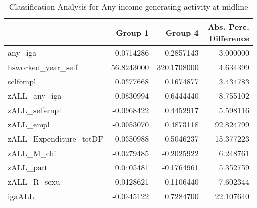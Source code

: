 \begin{table}

\caption{\label{tab:clanRany_iga}Classification Analysis for Any income-generating activity at midline}
\centering
\begin{tabular}[t]{lrrr}
\toprule
  & Group 1 & Group 4 & Abs. Perc. Difference\\
\midrule
any\_iga & 0.0714286 & 0.2857143 & 3.000000\\
hsworked\_year\_self & 56.8243000 & 320.1708000 & 4.634399\\
selfempl & 0.0377668 & 0.1674877 & 3.434783\\
zALL\_any\_iga & -0.0830994 & 0.6444440 & 8.755102\\
zALL\_selfempl & -0.0968422 & 0.4452917 & 5.598116\\
\addlinespace
zALL\_empl & -0.0053070 & 0.4873118 & 92.824799\\
zALL\_Expenditure\_totDF & -0.0350988 & 0.5046237 & 15.377223\\
zALL\_M\_chi & -0.0279485 & -0.2025922 & 6.248761\\
zALL\_part & 0.0405481 & -0.1764961 & 5.352759\\
zALL\_R\_sexu & -0.0128621 & -0.1106440 & 7.602344\\
\addlinespace
igaALL & -0.0345122 & 0.7284700 & 22.107640\\
\bottomrule
\end{tabular}
\end{table}
